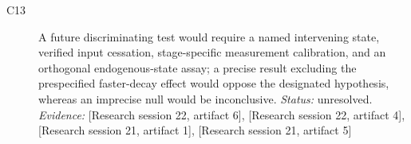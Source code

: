 \documentclass[11pt]{article}
\begin{document}
\begin{sloppypar}
\begin{description}
\item[C13] A future discriminating test would require a named intervening state, verified input cessation, stage-specific measurement calibration, and an orthogonal endogenous-state assay; a precise result excluding the prespecified faster-decay effect would oppose the designated hypothesis, whereas an imprecise null would be inconclusive. \textit{Status: }unresolved.
\textit{Evidence: }[Research session 22, artifact 6], [Research session 22, artifact 4], [Research session 21, artifact 1], [Research session 21, artifact 5]
\end{description}
\end{sloppypar}
\end{document}
